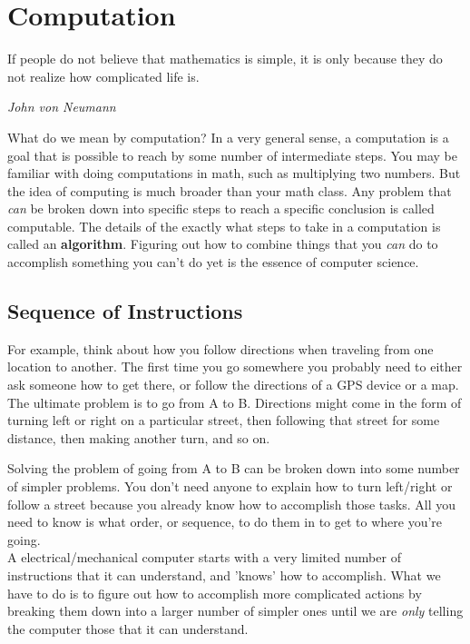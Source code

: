 \chapter{Computation}

\epigraph{If people do not believe that mathematics is simple, it is only because they do not realize how complicated life is.}{\textit{John von Neumann}}

What do we mean by computation? In a very general sense, a computation is a goal that is possible to reach by some number of intermediate steps. You may be familiar with doing computations in math, such as multiplying two numbers. But the idea of computing is much broader than your math class. Any problem that \textit{can} be broken down into specific steps to reach a specific conclusion is called computable. The details of the exactly what steps to take in a computation is called an \textbf{algorithm}. Figuring out how to combine things that you \textit{can} do to accomplish something you can't do yet is the essence of computer science.\\

\section{Sequence of Instructions}

For example, think about how you follow directions when traveling from one location to another. The first time you go somewhere you probably need to either ask someone how to get there, or follow the directions of a GPS device or a map. The ultimate problem is to go from A to B. Directions might come in the form of turning left or right on a particular street, then following that street for some distance, then making another turn, and so on.\\


Solving the problem of going from A to B can be broken down into some number of simpler problems. You don't need anyone to explain how to turn left/right or follow a street because you already know how to accomplish those tasks. All you need to know is what order, or sequence, to do them in to get to where you're going.\\

A electrical/mechanical computer starts with a very limited number of instructions that it can understand, and 'knows' how to accomplish. What we have to do is to figure out how to accomplish more complicated actions by breaking them down into a larger number of simpler ones until we are \textit{only} telling the computer those that it can understand.

